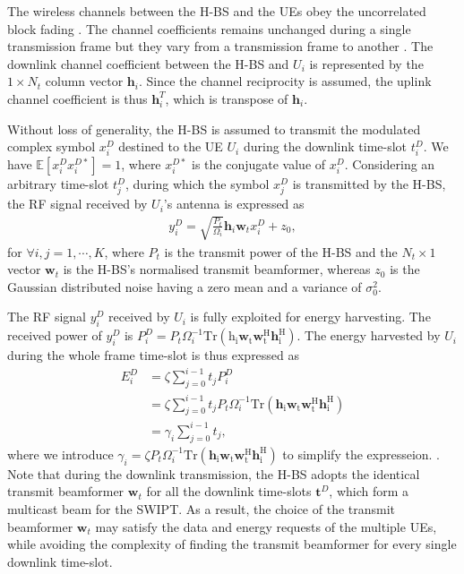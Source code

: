 \documentclass[12pt,draft,onecolumn,journal]{IEEEtran}
\begin{document}
The wireless channels between the H-BS and the UEs obey the uncorrelated block fading \cite{access_3}. The channel coefficients remains unchanged during a single transmission frame but they vary from a transmission frame to another \cite{access_4}. The downlink channel coefficient between the H-BS and $U_i$ is represented by the $1\times N_t$ column vector $\mathbf{h}_i$. Since the channel reciprocity is assumed, the uplink channel coefficient is thus $\mathbf{h}_i^T$, which is transpose of $\mathbf{h}_i$.


Without loss of generality, the H-BS is assumed to transmit the modulated complex symbol $x_i^D$ destined to the UE $U_i$ during the downlink time-slot $t_i^D$. We have $\mathbb{E}[x_i^Dx_i^{D*}] = 1$, where $x_i^{D*}$ is the conjugate value of $x_i^D$. Considering an arbitrary time-slot $t_j^D$, during which the symbol $x_j^D$ is transmitted by the H-BS, the RF signal received by $U_i$'s antenna is expressed as
\begin{align}
y_{i}^D = \sqrt{\frac{P_t}{\Omega_i}}\mathbf{h}_i\mathbf{w}_tx_i^D + z_0,
\end{align}
for $\forall i,j=1,\cdots,K$, where $P_t$ is the transmit power of the H-BS and the $N_t\times 1$ vector $\mathbf{w}_t$ is the H-BS's normalised transmit beamformer, whereas $z_0$ is the Gaussian distributed noise having a zero mean and a variance of $\sigma_0^2$.


The RF signal $y_{i}^D$ received by $U_i$ is fully exploited for energy harvesting. The received power of $y_{i}^D$ is $P_{i}^D = P_t \Omega_i^{-1} \boldsymbol{\mathrm{Tr({h}_i\mathbf{w}_t\mathbf{w}_t^H\mathbf{h}_i^H)}}$. The energy harvested by $U_i$ during the whole frame time-slot is thus expressed as
\begin{align}
E_{i}^D & = \zeta \sum_{j=0}^{i-1}t_{j}P_{i}^D \\
&=\zeta \sum_{j=0}^{i-1}t_{j}P_t \Omega_i^{-1} \boldsymbol{\mathrm {Tr(\mathbf{h}_i\mathbf{w}_t\mathbf{w}_t^H\mathbf{h}_i^H)}} \\
&=\gamma_i\sum_{j=0}^{i-1}t_{j},
\end{align}
where we introduce $\gamma_i=\zeta P_t\Omega_i^{-1}\boldsymbol{\mathrm{Tr(\mathbf{h}_i\mathbf{w}_t\mathbf{w}_t^H\mathbf{h}_i^H)}}$ to simplify the expresseion. \cbend. Note that during the downlink transmission, the H-BS adopts the identical transmit beamformer $\mathbf{w}_t$ for all the downlink time-slots $\mathbf{t}^D$, which form a multicast beam for the SWIPT. As a result, the choice of the transmit beamformer $\mathbf{w}_t$ may satisfy the data and energy requests of the multiple UEs, while avoiding the complexity of finding the transmit beamformer for every single downlink time-slot.
\end{document}
